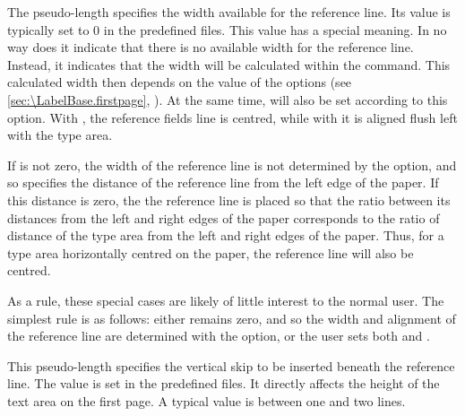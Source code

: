 \begin{Declaration}
\end{Declaration}
The  pseudo-length specifies the width available for the
reference line. Its value is typically set to 0 in the predefined
 files.
This value has a special meaning. In no way does it
indicate that there is no available width for the reference line. Instead, it
indicates that the width will be calculated within the
 command. This calculated
width then depends on the value of the %
%
 options (see
\autoref{sec:\LabelBase.firstpage}, ). At
the same time,  will also be set according to this option.
With %
, the reference fields line is
centred, while with %
 it is aligned flush left with the
type area.

If  is not zero, the width of the reference line is not
determined by the   option, and so
 specifies the distance of the reference line from the left
edge of the paper. If this distance is zero, the the
reference line is placed so that the ratio between its distances from the left
and right edges of the paper corresponds to the ratio of distance of the type
area from the left and right edges of the paper. Thus, for a type area
horizontally centred on the paper, the reference line will also be centred.

As a rule, these special cases are likely of little interest to the normal
user. The simplest rule is as follows: either
 remains zero, and so the width and alignment of the
reference line are determined with the 
option, or the user sets both  and .%
\EndIndexGroup


\begin{Declaration}
\end{Declaration}
This pseudo-length specifies the vertical skip to be inserted beneath the
reference line. The value is set in the predefined 
files. It directly
affects the height of the text area on the first page. A typical value is
between one and two lines.%
\EndIndexGroup
%
\EndIndexGroup


